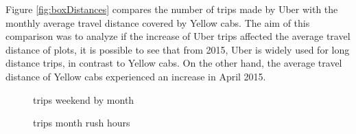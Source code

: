 Figure \ref{fig:boxDistances} compares the number of trips made by Uber with the monthly average travel distance covered by Yellow cabs. The aim of this comparison was to analyze if the increase of Uber trips affected the average travel distance of   plots, it is possible to see that from 2015, Uber is widely used for long distance trips, in contrast to Yellow cabs. On the other hand, the average travel distance of Yellow cabs experienced an increase in April 2015. 


%



\begin{figure}%
\centering
{}%
\qquad
{}%
\qquad
{}%
\qquad
{}%
\caption{trips weekend by month }
\label{fig:boxTrips}%
\end{figure}




\begin{figure}%
\centering
{}%
\qquad
{}%
\qquad
{}%
\qquad
{}%
\caption{trips month rush hours }
\label{fig:boxTrips}%
\end{figure}




